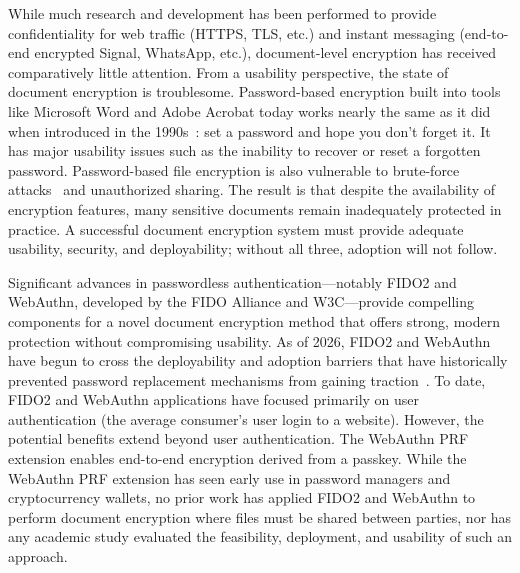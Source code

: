 While much research and development has been performed to provide confidentiality for web traffic (HTTPS, TLS, etc.) and instant messaging (end-to-end encrypted Signal\texttrademark{}, WhatsApp\texttrademark{}, etc.), document-level encryption has received comparatively little attention. From a usability perspective, the state of document encryption is troublesome. Password-based encryption built into tools like Microsoft Word\textregistered{} and Adobe Acrobat\textregistered{}  today works nearly the same as it did when introduced in the 1990s~\cite{adobe_pdf_timeline}: set a password and hope you don't forget it. It has major usability issues such as the inability to recover or reset a forgotten password. Password-based file encryption is also vulnerable to brute-force attacks~\cite{danczul_cuteforce_2013,hranicky_experimental_2024} and unauthorized sharing. The result is that despite the availability of encryption features, many sensitive documents remain inadequately protected in practice. A successful document encryption system must provide adequate usability, security, and deployability; without all three, adoption will not follow.

Significant advances in passwordless authentication---notably FIDO2 and WebAuthn, developed by the FIDO Alliance and W3C---provide compelling components for a novel document encryption method that offers strong, modern protection without compromising usability. As of 2026, FIDO2 and WebAuthn have begun to cross the deployability and adoption barriers that have historically prevented password replacement mechanisms from gaining traction~\cite{fido_state_of_passkeys_2026}. To date, FIDO2 and WebAuthn applications have focused primarily on user authentication (the average consumer's user login to a website). However, the potential benefits extend beyond user authentication. The WebAuthn PRF extension enables end-to-end encryption derived from a passkey. While the WebAuthn PRF extension has seen early use in password managers and cryptocurrency wallets, no prior work has applied FIDO2 and WebAuthn to perform document encryption where files must be shared between parties, nor has any academic study evaluated the feasibility, deployment, and usability of such an approach.

